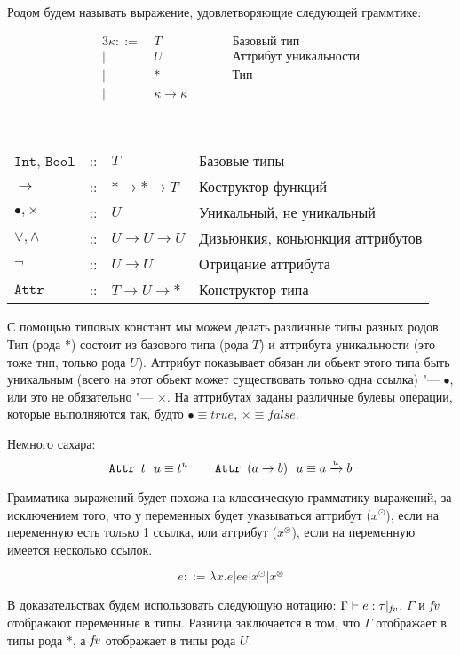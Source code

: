 \begin{definition}[Род]
	Родом будем называть выражение, удовлетворяющие следующей граммтике:
	\begin{bnf}
	\begin{alignat*}{3}
		\kappa ::= &\ T && \qquad \text{Базовый тип} \\
				 | &\ U && \qquad \text{Аттрибут уникальности} \\
				 | &\ * && \qquad \text{Тип} \\
				 | &\ \kappa \to \kappa
	\end{alignat*}
	\end{bnf}
\end{definition}
\begin{definition}\ \\
	\begin{tabular}{llll}
		$\mathtt{Int}$, $\mathtt{Bool}$ & :: & $T$ & Базовые типы \\
		$\to$                   & :: & $* \to * \to T$ & Коструктор функций \\
		$\bullet, \times$               & :: & $U$ & Уникальный, не уникальный \\
		$\vee, \wedge$                  & :: & $U \to U \to U$ & Дизьюнкия, коньюнкция аттрибутов \\
		$\neg$                          & :: & $U \to U$ & Отрицание аттрибута \\
		$\mathtt{Attr}$                 & :: & $T \to U \to *$ & Конструктор типа
	\end{tabular}
\end{definition}
С помощью типовых констант мы можем делать различные типы разных родов. 
Тип (рода $*$) состоит из базового типа (рода $T$) и аттрибута уникальности (это тоже тип, только рода $U$). 
Аттрибут показывает обязан ли обьект этого типа быть уникальным (всего на этот обьект может существовать только одна ссылка) "--- $\bullet$,
или это не обязательно "--- $\times$.
На аттрибутах заданы различные булевы операции, которые выполняются так, будто $\bullet \equiv true$, $\times \equiv false$.

Немного сахара:
\[
	\mathinner{\mathtt{Attr}}~t~~u \equiv t^u \qquad \mathinner{\mathtt{Attr}}~(a \to b)~~u \equiv a \xrightarrow{u} b
\]

Грамматика выражений будет похожа на классическую грамматику выражений, за исключением того,
что у переменных будет указываться аттрибут ($x^\odot$), если на переменную есть только 1 ссылка,
или аттрибут ($x^\otimes$), если на переменную имеется несколько ссылок.
\begin{bnf}
\[
	e ::= \lambda x.e | ee | x^\odot | x^\otimes
\]
\end{bnf}%
В доказательствах будем использовать следующую нотацию: $\Gamma \vdash e : \tau |_{\mathit{fv}}$.
$\Gamma$ и $\mathit{fv}$ отображают переменные в типы. 
Разница заключается в том, что $\Gamma$ отображает в типы рода $*$,
а $\mathit{fv}$ отображает в типы рода $U$.


